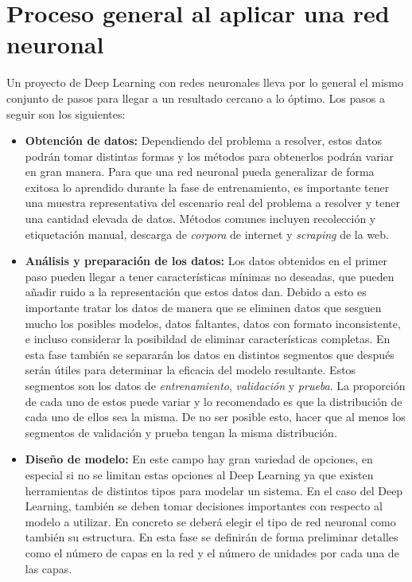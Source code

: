 \section{Proceso general al aplicar una red neuronal}
\label{sec:nlpprocess}

Un proyecto de Deep Learning con redes neuronales lleva por lo general el mismo conjunto de pasos para llegar a un resultado cercano a lo óptimo. Los pasos a seguir son los siguientes:

\begin{itemize}
\item \textbf{Obtención de datos:} Dependiendo del problema a resolver, estos datos podrán tomar distintas formas y los métodos para obtenerlos podrán variar en gran manera. Para que una red neuronal pueda generalizar de forma exitosa lo aprendido durante la fase de entrenamiento, es importante tener una muestra representativa del escenario real del problema a resolver y tener una cantidad elevada de datos. Métodos comunes incluyen recolección y etiquetación manual, descarga de \textit{\gls{corpora}} de internet y \textit{\gls{scraping}} de la web.

\item \textbf{Análisis y preparación de los datos:} Los datos obtenidos en el primer paso pueden llegar a tener características mínimas no deseadas, que pueden añadir ruido a la representación que estos datos dan. Debido a esto es importante tratar los datos de manera que se eliminen datos que sesguen mucho los posibles modelos, datos faltantes, datos con formato inconsistente, e incluso considerar la posibildad de eliminar características completas. En esta fase también se separarán los datos en distintos segmentos que después serán útiles para determinar la eficacia del modelo resultante. Estos segmentos son los datos de \textit{entrenamiento}, \textit{validación} y \textit{prueba}. La proporción de cada uno de estos puede variar y lo recomendado es que la distribución de cada uno de ellos sea la misma. De no ser posible esto, hacer que al menos los segmentos de validación y prueba tengan la misma distribución.

\item \textbf{Diseño de modelo:} En este campo hay gran variedad de opciones, en especial si no se limitan estas opciones al Deep Learning ya que existen herramientas de distintos tipos para modelar un sistema. En el caso del Deep Learning, también se deben tomar decisiones importantes con respecto al modelo a utilizar. En concreto se deberá elegir el tipo de red neuronal como también su estructura. En esta fase se definirán de forma preliminar detalles como el número de capas en la red y el número de unidades por cada una de las capas.


\end{itemize}
